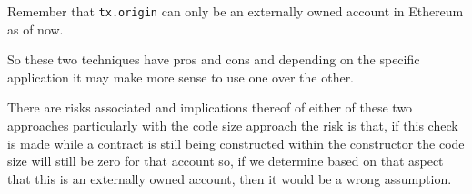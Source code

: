 Remember that \texttt{tx.origin} can only be an externally owned account
in Ethereum as of now.

So these two techniques have pros and cons and depending on the specific
application it may make more sense to use one over the other.

There are risks associated and implications thereof of either of these
two approaches particularly with the code size approach the risk is
that, if this check is made while a contract is still being constructed
within the constructor the code size will still be zero for that account
so, if we determine based on that aspect that this is an externally
owned account, then it would be a wrong assumption.
